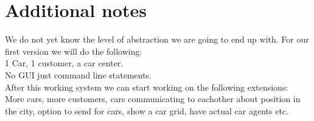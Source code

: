 \documentclass[8pt]{article}
\begin{document}
\section{Additional notes}
We do not yet know the level of abstraction we are going to end up with. For our first version we will do the following:\\
1 Car, 1 customer, a car center. \\
No GUI just command line statements.\\
After this working system we can start working on the following extensions:\\
More cars, more customers, cars communicating to eachother about position in the city, option to send for cars, show a car grid, have actual car agents etc.
\end{document}
